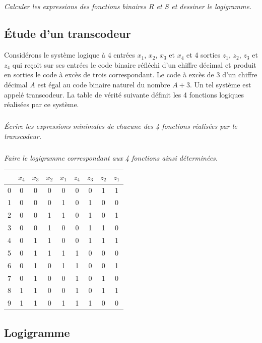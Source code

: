 \documentclass[10pt]{article}
\begin{document}
\subparagraph{}
\textit{Calculer les expressions des fonctions binaires $R$ et $S$ et dessiner le logigramme.}


\subsection*{Étude d'un transcodeur}
\setcounter{subparagraph}{0}
\begin{minipage}[c]{.62\linewidth}
Considérons le système logique à 4 entrées $x_1$, $x_2$, $x_3$ et $x_4$ et 4 sorties $z_1$, $z_2$, $z_3$ et $z_4$ qui reçoit sur ses entrées le code binaire réfléchi d’un chiffre décimal et produit en sorties le code à excès de trois correspondant. Le code à excès de 3 d’un chiffre décimal $A$ est égal au code binaire naturel du nombre $A+3$. Un tel système est appelé transcodeur. La table de vérité suivante définit les 4 fonctions logiques réalisées par ce système. 
\subparagraph{}
\textit{Écrire les expressions minimales de chacune des 4 fonctions réalisées par le transcodeur.}%
\subparagraph{}
\textit{Faire le logigramme correspondant aux 4 fonctions ainsi déterminées.}
\end{minipage}\hfill
\begin{minipage}[c]{.35\linewidth}
\begin{center}
\begin{tabular}{|c|cccc|cccc|}
\hline
 & $x_4$ & $x_3$ & $x_2$ & $x_1$ & $z_4$ & $z_3$ & $z_2$ & $z_1$ \\
\hline
\hline
0 & 0 & 0 & 0 & 0 & 0 & 0 & 1 & 1 \\
1 & 0 & 0 & 0 & 1 & 0 & 1 & 0 & 0 \\
2 & 0 & 0 & 1 & 1 & 0 & 1 & 0 & 1 \\
3 & 0 & 0 & 1 & 0 & 0 & 1 & 1 & 0 \\
4 & 0 & 1 & 1 & 0 & 0 & 1 & 1 & 1 \\
5 & 0 & 1 & 1 & 1 & 1 & 0 & 0 & 0 \\
6 & 0 & 1 & 0 & 1 & 1 & 0 & 0 & 1 \\
7 & 0 & 1 & 0 & 0 & 1 & 0 & 1 & 0 \\
8 & 1 & 1 & 0 & 0 & 1 & 0 & 1 & 1 \\
9 & 1 & 1 & 0 & 1 & 1 & 1 & 0 & 0 \\
\hline
\end{tabular}
\end{center}
\end{minipage}

\subsection*{Logigramme}
\setcounter{subparagraph}{0}
\end{document}
